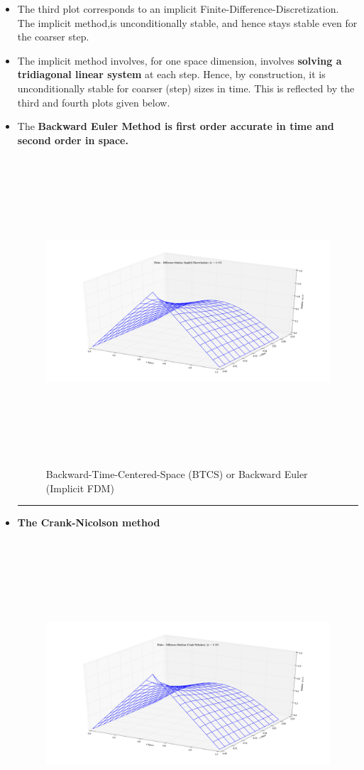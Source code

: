 \begin{itemize} 
\item The third plot corresponds to an implicit Finite-Difference-Discretization. The implicit method,is unconditionally stable, and hence stays stable even for the coarser step. 
\item The implicit method involves, for one space dimension, involves {\bf solving a tridiagonal linear system} at each step. Hence, by construction, it is unconditionally stable for coarser (step) sizes in time. This is reflected by the third and fourth plots given below. 
\item The {\bf Backward Euler Method is first order accurate in time and second order in space.} 
\begin{figure}[H]
\includegraphics[width=7in, height=4.5in]{Fig3}
\caption{Backward-Time-Centered-Space (BTCS) or Backward Euler (Implicit FDM) }
\end{figure}\hrule
\newpage\item {\bf  The Crank-Nicolson method } 
\begin{figure}[H]
\includegraphics[width=7in, height=4.5in]{Fig4}

\end{figure}
\end{itemize}
